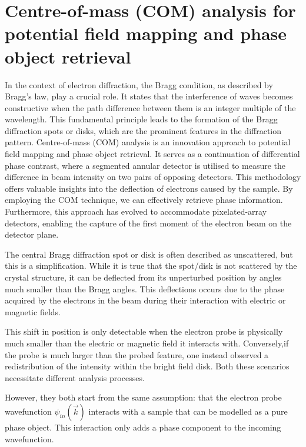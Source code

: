 
\chapter{Centre-of-mass (COM) analysis for potential field mapping and phase object retrieval}
\label{sec:COM}
%
In the context of electron diffraction, the Bragg condition, as described by Bragg's law, play a crucial role. It states that the interference of waves becomes constructive when the path difference between them is an integer multiple of the wavelength. This fundamental principle leads to the formation of the Bragg diffraction spots or disks, which are the prominent features in the diffraction pattern.
%
%
Centre-of-mass (COM) analysis is an innovation approach to potential field mapping and phase object retrieval. 
%
It serves as a continuation of differential phase contrast, where a segmented annular detector is utilised to measure the difference in beam intensity on two pairs of opposing detectors. 
%
This methodology offers valuable insights into the deflection of electrons caused by the sample. 
%
By employing the COM technique, we can effectively  retrieve phase information. 
%
Furthermore, this approach has evolved to accommodate pixelated-array detectors, enabling the capture of the first moment of the electron beam on the detector plane. 

The central Bragg diffraction spot or disk is often described as unscattered, but this is a simplification. 
%
While it is true that the spot/disk is not scattered by the crystal structure, it can be deflected from its  unperturbed position by angles much smaller than the Bragg angles. 
%
This deflections occurs due to the phase acquired by the electrons in the beam during their interaction with electric or magnetic fields.

This shift in position is only detectable when the electron probe is physically much smaller than the electric or magnetic field it interacts with.
%
Conversely,if the probe is much larger than the probed feature, one instead observed a redistribution of the intensity within the bright field disk.
%
Both these scenarios necessitate different analysis processes.

However, they both start from the same assumption: that the electron probe wavefunction $\psi_{in}(\vec{k})$ interacts with a sample that can be modelled as a pure phase object. This interaction only adds a phase component to the incoming wavefunction\cite{caoTheoryPracticeElectron2018, lazicPhaseContrastSTEM2016}. 

